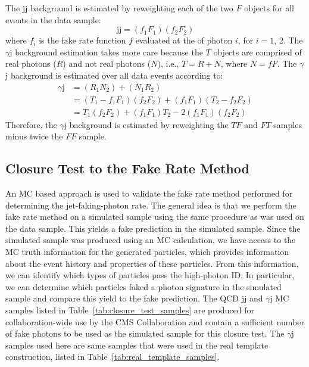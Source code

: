 The jj background is estimated by reweighting each of the two $F$ objects for all events in the data sample:
\begin{equation}
  \text{jj} = (f_1F_1)(f_2F_2)
\end{equation}
 \noindent where $f_i$ is the fake rate function $f$ evaluated at the \pt of photon $i$, for $i=1$, 2. The $\gamma$j background estimation takes more care because the $T$ objects are comprised of real photons ($R$) and not real photons ($N$), i.e., $T = R+N$, where $N=fF$. The $\gamma$j background is estimated over all data events according to:
\begin{align}
  \gamma\text{j} &= (R_1N_2)+(N_1R_2) \\
  &= (T_1-f_1F_1)(f_2F_2) + (f_1F_1)(T_2-f_2F_2) \\
  &= T_1(f_2F_2)+(f_1F_1)T_2-2(f_1F_1)(f_2F_2)
\end{align}
\noindent Therefore, the $\gamma$j background is estimated by reweighting the $TF$ and $FT$ samples minus twice the $FF$ sample.


\subsection{Closure Test to the Fake Rate Method}\label{ssec:closure_test}

An MC based approach is used to validate the fake rate method performed for determining the jet-faking-photon rate. The general idea is that we perform the fake rate method on a simulated sample using the same procedure as was used on the data sample. This yields a fake prediction in the simulated sample. Since the simulated sample was produced using an MC calculation, we have access to the MC truth information for the generated particles, which provides information about the event history and properties of these particles. From this information, we can identify which types of particles pass the high-\pt photon ID. In particular, we can determine which particles faked a photon signature in the simulated sample and compare this yield to the fake prediction. The QCD jj and $\gamma$j MC samples listed in Table~\ref{tab:closure_test_samples} are produced for collaboration-wide use by the CMS Collaboration and contain a sufficient number of fake photons to be used as the simulated sample for this closure test. The $\gamma$j samples used here are same samples that were used in the real template construction, listed in Table~\ref{tab:real_template_samples}.

